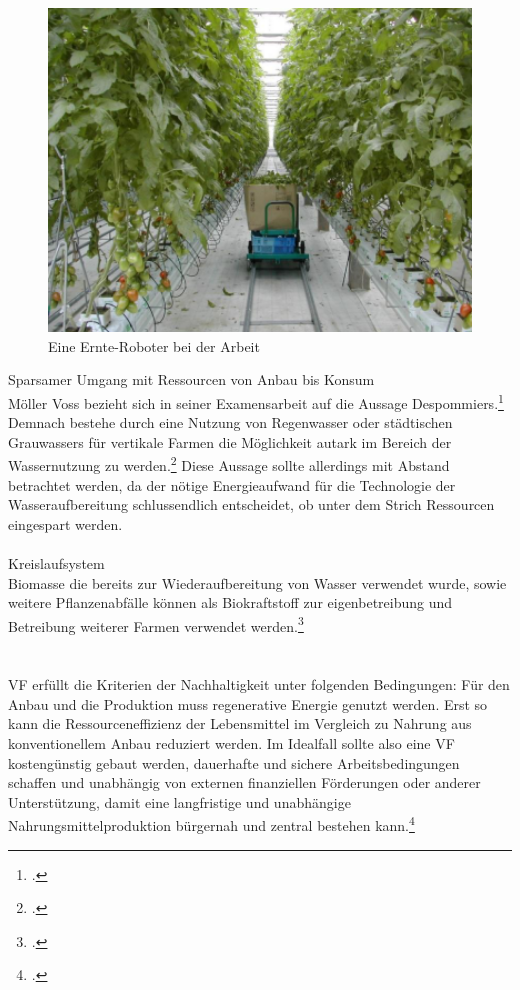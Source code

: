 \documentclass{scrartcl}
\begin{document}
\begin{figure}[htbp]
\centering
\includegraphics[width=14cm]{image_folder/automatisation_kondo.png}
\caption{Eine Ernte-Roboter bei der Arbeit}
\label{fig:Automatisierung}
\end{figure}



Sparsamer Umgang mit Ressourcen von Anbau bis Konsum\\
Möller Voss bezieht sich in seiner Examensarbeit auf die Aussage Despommiers.\footcite[S.9]{PeterMollerVoss2013VerticalRise} Demnach bestehe durch eine Nutzung von Regenwasser oder städtischen Grauwassers für vertikale Farmen die Möglichkeit autark im Bereich der Wassernutzung zu werden.\footcites[Vgl.]{Despommier2010TheCentury.} Diese Aussage sollte allerdings mit Abstand betrachtet werden, da der nötige Energieaufwand für die Technologie der Wasseraufbereitung schlussendlich entscheidet, ob unter dem Strich Ressourcen eingespart werden.\\
\\
Kreislaufsystem\\
Biomasse die bereits zur Wiederaufbereitung von Wasser verwendet wurde, sowie weitere Pflanzenabfälle können als Biokraftstoff zur eigenbetreibung und Betreibung weiterer Farmen verwendet werden.\footcites[Vgl.][S.80ff]{Despommier2009TheFarms}\\
\\
\\
VF erfüllt die Kriterien der Nachhaltigkeit unter folgenden Bedingungen:
Für den Anbau und die Produktion muss regenerative Energie genutzt werden. Erst so kann die Ressourceneffizienz der Lebensmittel im Vergleich zu Nahrung aus konventionellem Anbau reduziert werden. 
Im Idealfall sollte also eine VF kostengünstig gebaut werden, dauerhafte und sichere Arbeitsbedingungen schaffen und unabhängig von externen finanziellen Förderungen oder anderer Unterstützung, damit eine langfristige und unabhängige Nahrungsmittelproduktion bürgernah und zentral bestehen kann.\footcite{Despommier2010TheCentury.}
\end{document}
